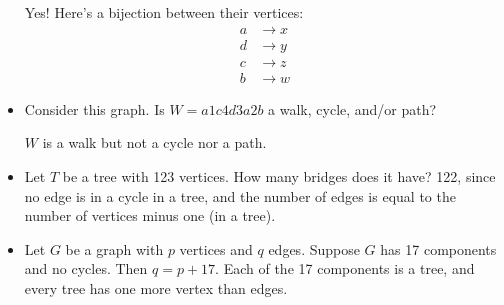 \documentclass[]{article}
\theoremstyle{definition}
\newcommand{\lecture}[1]{\marginpar{{\footnotesize $\leftarrow$ \underline{#1}}}}
\begin{document}
\begin{itemize}
\begin{center}
				\end{center}

				Yes! Here's a bijection between their vertices:
				\begin{align*}
					a &\to x \\
					d &\to y \\
					c &\to z \\
					b &\to w
				\end{align*}

			\item Consider this graph. Is $W = a1c4d3a2b$ a walk, cycle, and/or path?
				\begin{center}
				\end{center}

				$W$ is a walk but not a cycle nor a path.
				
			\item \lecture{March 15, 2013}
				Let $T$ be a tree with 123 vertices. How many bridges does it have? 122, since no edge is in a cycle in a tree, and the number of edges is equal to the number of vertices minus one (in a tree).
			
			\item Let $G$ be a graph with $p$ vertices and $q$ edges. Suppose $G$ has 17 components and no cycles. Then $q = p + 17$. Each of the 17 components is a tree, and every tree has one more vertex than edges.
			

\end{itemize}
\end{document}
